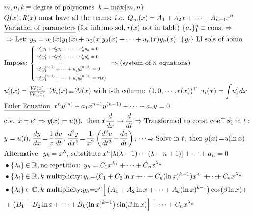     \vspace{-5pt}
\begin{align*}
    &m, n, k \equiv \text{degree of polynomes} \; \;  k = \max\{m,n\}\\
   &Q(x), R(x) \text{ must have all the terms: } i.e. \;\; Q_m(x)= A_1 +A_2x+ \cdots+ A_{n+1}x^n\\
   &\underline{\text{Variation of parameters}} \ \text{(for inhomo sol, $r(x)$ not in table)} \ \{a_i\}_1^n\equiv \text{const} \Rightarrow \\
    &\Rightarrow \text{Let: } y_p = u_1(x)y_1(x) + u_2(x)y_2(x) + \cdots + u_n(x)y_n(x); \ \{y_i\} \text{ LI sols of homo}\\
    &\text{Impose: } 
  \scalebox{0.7}{$
\left\{
\begin{array}{l}
u_1'y_1 + u_2'y_2 + \cdots + u_n'y_n = 0 \\[1ex]
u_1'y_1' + u_2'y_2' + \cdots + u_n'y_n' = 0 \\
\hspace{45pt}\cdots \\
u_1'y_1^{(n-2)} + \cdots + u_n'y_n^{(n-2)} = 0 \\[1ex]
u_1'y_1^{(n-1)} + \cdots + u_n'y_n^{(n-1)} = r(x)
\end{array}
\right.
$}
 \Rightarrow \text{(system of $n$ equations)}\\
    &u_i'(x) = \tfrac{\mathcal{W}(x)}{\mathcal{W}_i (x)} \;\;  \mathcal{W}_i (x) \!\equiv \! \mathcal{W}(x) \text{ with i-th column: } (0,0, \cdots, r(x))^{\text{T}} \; \; u_i(x)= \int \!u_i' \;\! dx\\
     &\underline{\text{Euler Equation}} \;\; x^n y^{(n)} + a_1 x^{n-1} y^{(n-1)} + \cdots + a_n y = 0\\
    &\text{c.v. } x = e^t \Rightarrow y(x) = u(t), \text{ then } x \frac{d}{dx} \to \frac{d}{dt} \Rightarrow \text{Transformed to const coeff eq in } t:\\
    &y = u(t), \;\! \frac{dy}{dx} \!=\! \frac{1}{x}\frac{du}{dt}, \;\! \frac{d^2y}{dx^2} \!=\! \frac{1}{x^2}\left(\frac{d^2u}{dt^2} \!-\! \frac{du}{dt} \right), \;\!\cdots \!\Rightarrow \text{Solve in } t,\; \text{then } y(x) \!=\! u(\ln x)\\ 
    &\text{Alternative: } y_h = x^\lambda\text{, substitute } x^n[\lambda(\lambda-1)\cdots(\lambda-n+1)] + \cdots + a_n = 0\\
&\bullet \{\lambda_i\} \in \mathbb{R}, \text{no repetition: }y_h = C_1x^{\lambda_1} + \cdots + C_nx^{\lambda_n}\\
&\bullet  \{\lambda_i\} \in \mathbb{R}, k\text{ multiplicity:}\;\! y_h {=} (C_1 + C_2\ln x + \!\!\cdots\!\! + C_k(\ln x)^{k-1})x^{\lambda_1} +\!\!\cdots\!\! + C_nx^{\lambda_n}\\
&\bullet  \{\lambda_i\} \in \mathbb{C}, k\text{ multiplicity:} y_h {=} 
x^{\alpha} \Big[\left(A_1 + A_2 \ln x + \cdots + A_{k}(\ln x)^{k-1}\right)\cos(\beta \ln x) +\\
& + \left(B_1 + B_2 \ln x + \cdots + B_{k}(\ln x)^{k-1}\right)\sin(\beta \ln x)\Big] + \cdots + C_nx^{\lambda_n}
\end{align*}
